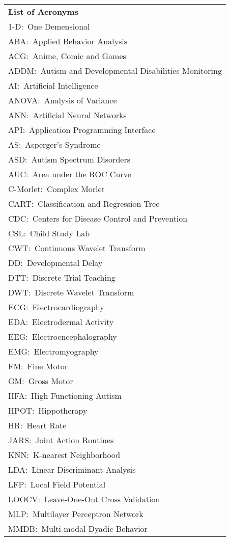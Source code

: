 \begin{longtable}{l}
\Huge {\bf List of Acronyms}\\
1-D:~One Demensional\\
ABA:~Applied Behavior Analysis\\
ACG:~Anime, Comic and Games\\
ADDM:~Autism and Developmental Disabilities Monitoring\\
AI:~Artificial Intelligence\\
ANOVA:~Analysis of Variance\\
ANN:~Artificial Neural Networks\\
API:~Application Programming Interface\\
AS:~Asperger's Syndrome\\
ASD:~Autism Spectrum Disorders\\
AUC:~Area under the ROC Curve\\
C-Morlet:~Complex Morlet\\
CART:~Classification and Regression Tree\\
CDC:~Centers for Disease Control and Prevention\\
CSL:~Child Study Lab\\
CWT:~Continuous Wavelet Transform\\
DD:~Developmental Delay\\
DTT:~Discrete Trial Teaching\\
DWT:~Discrete Wavelet Transform\\
ECG:~Electrocardiography\\
EDA:~Electrodermal Activity\\
EEG:~Electroencephalography\\
EMG:~Electromyography\\
FM:~Fine Motor\\
GM:~Gross Motor\\
HFA:~High Functioning Autism\\
HPOT:~Hippotherapy\\
HR:~Heart Rate\\
JARS:~Joint Action Routines\\
KNN:~K-nearest Neighborhood\\
LDA:~Linear Discriminant Analysis\\
LFP:~Local Field Potential\\
LOOCV:~Leave-One-Out Cross Validation\\
MLP:~Multilayer Perceptron Network\\
MMDB:~Multi-modal Dyadic Behavior\\

\end{longtable}
